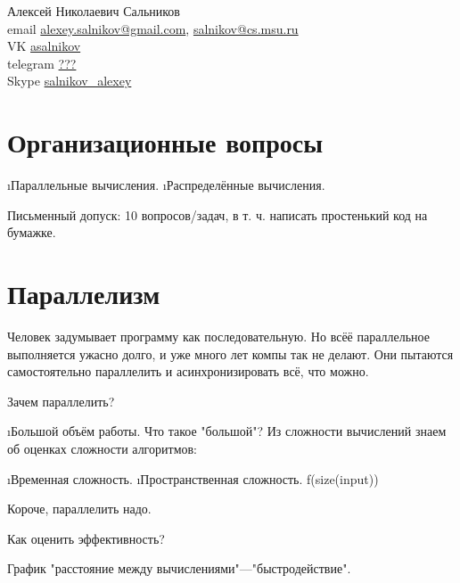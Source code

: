 

\usepackage{hyperref,texlinks}


 Алексей Николаевич Сальников\\
 email \href{mailto:alexey.salnikov@gmail.com}{alexey.salnikov@gmail.com}, \href{mailto:salnikov@cs.msu.ru}{salnikov@cs.msu.ru}\\
 VK \href{http://vk.com/asalnikov}{asalnikov}\\
 telegram \href{tg:???}{???}\\
 Skype \href{skype:salnikov\_alexey}{salnikov\_alexey}
 
\section{Организационные вопросы}
 \begin{enumerate}
  \i Параллельные вычисления.
  \i Распределённые вычисления.
 \end{enumerate}
 Письменный допуск: 10 вопросов/задач, в т. ч. написать простенький код на бумажке.
 
 \section{Параллелизм}
 Человек задумывает программу как последовательную. Но всёё параллельное выполняется ужасно долго, и уже много лет компы так не делают. Они пытаются самостоятельно параллелить и асинхронизировать всё, что можно.
 
 Зачем параллелить?
 \begin{enumerate}
  \i Большой объём работы.
  Что такое "большой"? Из сложности вычислений знаем об оценках сложности алгоритмов:
  \begin{enumerate}
   \i Временная сложность.
   \i Пространственная сложность.
     f(size(input))
  \end{enumerate}
 \end{enumerate}

 Короче, параллелить надо.
 
 Как оценить эффективность?
 
 График "расстояние между вычислениями"---"быстродействие".
 
